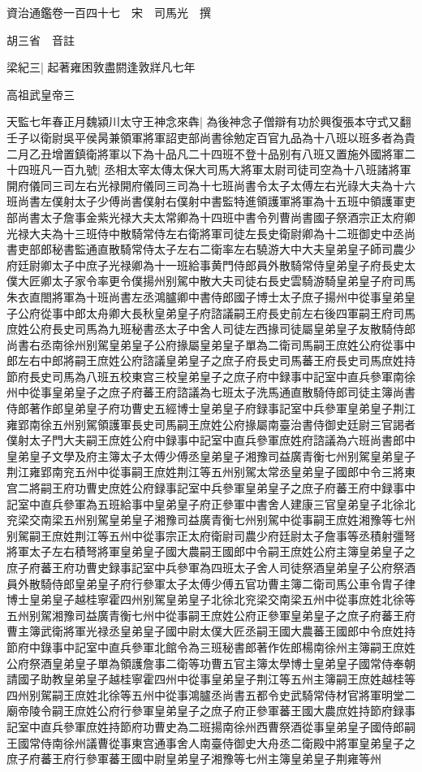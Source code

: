 資治通鑑卷一百四十七　宋　司馬光　撰

胡三省　音註

梁紀三|{
	起著雍困敦盡閼逢敦牂凡七年}


高祖武皇帝三

天監七年春正月魏潁川太守王神念來犇|{
	為後神念子僧辯有功於興復張本守式又翻}
壬子以衛尉吳平侯昺兼領軍將軍詔吏部尚書徐勉定百官九品為十八班以班多者為貴二月乙丑增置鎮衛將軍以下為十品凡二十四班不登十品别有八班又置施外國將軍二十四班凡一百九號|{
	丞相太宰太傳太保大司馬大將軍太尉司徒司空為十八班諸將軍開府儀同三司左右光禄開府儀同三司為十七班尚書令太子太傅左右光祿大夫為十六班尚書左僕射太子少傅尚書僕射右僕射中書監特進領護軍將軍為十五班中領護軍吏部尚書太子詹事金紫光禄大夫太常卿為十四班中書令列曹尚書國子祭酒宗正太府卿光禄大夫為十三班侍中散騎常侍左右衛將軍司徒左長史衛尉卿為十二班御史中丞尚書吏部郎秘書監通直散騎常侍太子左右二衛率左右驍游大中大夫皇弟皇子師司農少府廷尉卿太子中庶子光禄卿為十一班給事黄門侍郎員外散騎常侍皇弟皇子府長史太僕大匠卿太子家令率更令僕揚州别駕中散大夫司徒右長史雲騎游騎皇弟皇子府司馬朱衣直閤將軍為十班尚書左丞鴻臚卿中書侍郎國子博士太子庶子揚州中從事皇弟皇子公府從事中郎太舟卿大長秋皇弟皇子府諮議嗣王府長史前左右後四軍嗣王府司馬庶姓公府長史司馬為九班秘書丞太子中舍人司徒左西掾司徒屬皇弟皇子友散騎侍郎尚書右丞南徐州别駕皇弟皇子公府掾屬皇弟皇子單為二衛司馬嗣王庶姓公府從事中郎左右中郎將嗣王庶姓公府諮議皇弟皇子之庶子府長史司馬蕃王府長史司馬庶姓持節府長史司馬為八班五校東宫三校皇弟皇子之庶子府中録事中記室中直兵參軍南徐州中從事皇弟皇子之庶子府蕃王府諮議為七班太子洗馬通直散騎侍郎司徒主簿尚書侍郎著作郎皇弟皇子府功曹史五經博士皇弟皇子府録事記室中兵參軍皇弟皇子荆江雍郢南徐五州别駕領護軍長史司馬嗣王庶姓公府掾屬南臺治書侍御史廷尉三官謁者僕射太子門大夫嗣王庶姓公府中録事中記室中直兵參軍庶姓府諮議為六班尚書郎中皇弟皇子文學及府主簿太子太傅少傅丞皇弟皇子湘豫司益廣青衡七州别駕皇弟皇子荆江雍郢南兖五州中從事嗣王庶姓荆江等五州别駕太常丞皇弟皇子國郎中令三將東宫二將嗣王府功曹史庶姓公府録事記室中兵參軍皇弟皇子之庶子府蕃王府中録事中記室中直兵參軍為五班給事中皇弟皇子府正參軍中書舍人建康三官皇弟皇子北徐北兖梁交南梁五州别駕皇弟皇子湘豫司益廣青衡七州别駕中從事嗣王庶姓湘豫等七州别駕嗣王庶姓荆江等五州中從事宗正太府衛尉司農少府廷尉太子詹事等丞積射彊弩將軍太子左右積弩將軍皇弟皇子國大農嗣王國郎中令嗣王庶姓公府主簿皇弟皇子之庶子府蕃王府功曹史録事記室中兵參軍為四班太子舍人司徒祭酒皇弟皇子公府祭酒員外散騎侍郎皇弟皇子府行參軍太子太傅少傅五官功曹主簿二衛司馬公車令胄子律博士皇弟皇子越桂寧霍四州别駕皇弟皇子北徐北兖梁交南梁五州中從事庶姓北徐等五州别駕湘豫司益廣青衡七州中從事嗣王庶姓公府正參軍皇弟皇子之庶子府蕃王府曹主簿武衛將軍光禄丞皇弟皇子國中尉太僕大匠丞嗣王國大農蕃王國郎中令庶姓持節府中錄事中記室中直兵參軍北館令為三班秘書郎著作佐郎楊南徐州主簿嗣王庶姓公府祭酒皇弟皇子單為領護詹事二衛等功曹五官主簿太學博士皇弟皇子國常侍奉朝請國子助教皇弟皇子越桂寧霍四州中從事皇弟皇子荆江等五州主簿嗣王庶姓越桂等四州别駕嗣王庶姓北徐等五州中從事鴻臚丞尚書五都令史武騎常侍材官將軍明堂二廟帝陵令嗣王庶姓公府行參軍皇弟皇子之庶子府正參軍蕃王國大農庶姓持節府録事記室中直兵參軍庶姓持節府功曹史為二班揚南徐州西曹祭酒從事皇弟皇子國侍郎嗣王國常侍南徐州議曹從事東宫通事舍人南臺侍御史大舟丞二衛殿中將軍皇弟皇子之庶子府蕃王府行參軍蕃王國中尉皇弟皇子湘豫等七州主簿皇弟皇子荆雍等州}
